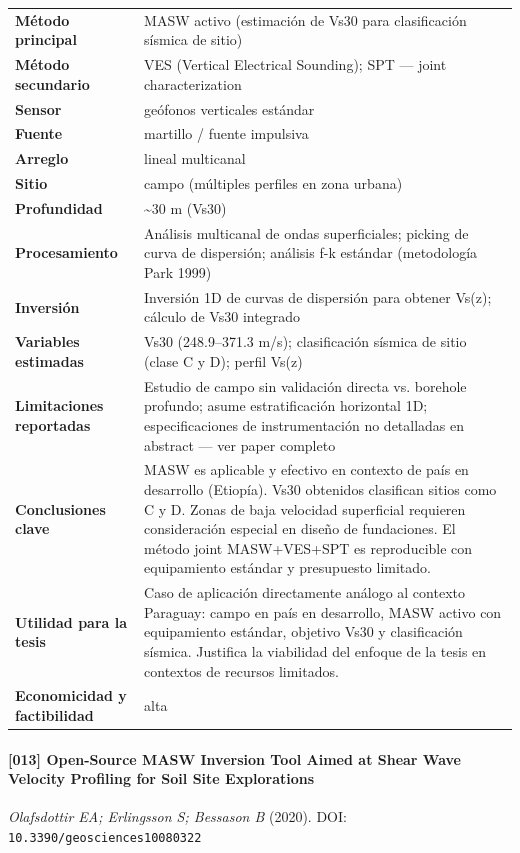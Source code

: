 \begin{center}\scriptsize
\begin{tabularx}{\textwidth}{@{}>{\bfseries}p{3.3cm} X@{}}
\toprule
M\'etodo principal & MASW activo (estimación de Vs30 para clasificación sísmica de sitio) \\
M\'etodo secundario & VES (Vertical Electrical Sounding); SPT --- joint characterization \\
Sensor & geófonos verticales estándar \\
Fuente & martillo / fuente impulsiva \\
Arreglo & lineal multicanal \\
Sitio & campo (múltiples perfiles en zona urbana) \\
Profundidad & \textasciitilde{}30 m (Vs30) \\
Procesamiento & Análisis multicanal de ondas superficiales; picking de curva de dispersión; análisis f-k estándar (metodología Park 1999) \\
Inversi\'on & Inversión 1D de curvas de dispersión para obtener Vs(z); cálculo de Vs30 integrado \\
Variables estimadas & Vs30 (248.9--371.3 m/s); clasificación sísmica de sitio (clase C y D); perfil Vs(z) \\
Limitaciones reportadas & Estudio de campo sin validación directa vs. borehole profundo; asume estratificación horizontal 1D; especificaciones de instrumentación no detalladas en abstract --- ver paper completo \\
Conclusiones clave & MASW es aplicable y efectivo en contexto de país en desarrollo (Etiopía). Vs30 obtenidos clasifican sitios como C y D. Zonas de baja velocidad superficial requieren consideración especial en diseño de fundaciones. El método joint MASW+VES+SPT es reproducible con equipamiento estándar y presupuesto limitado. \\
Utilidad para la tesis & Caso de aplicación directamente análogo al contexto Paraguay: campo en país en desarrollo, MASW activo con equipamiento estándar, objetivo Vs30 y clasificación sísmica. Justifica la viabilidad del enfoque de la tesis en contextos de recursos limitados. \\
Economicidad y factibilidad & alta \\
\bottomrule
\end{tabularx}
\end{center}

\paragraph{[013] Open-Source MASW Inversion Tool Aimed at Shear Wave Velocity Profiling for Soil Site Explorations} \emph{Olafsdottir EA; Erlingsson S; Bessason B} (2020).
{\scriptsize DOI: \texttt{10.3390/geosciences10080322}}

